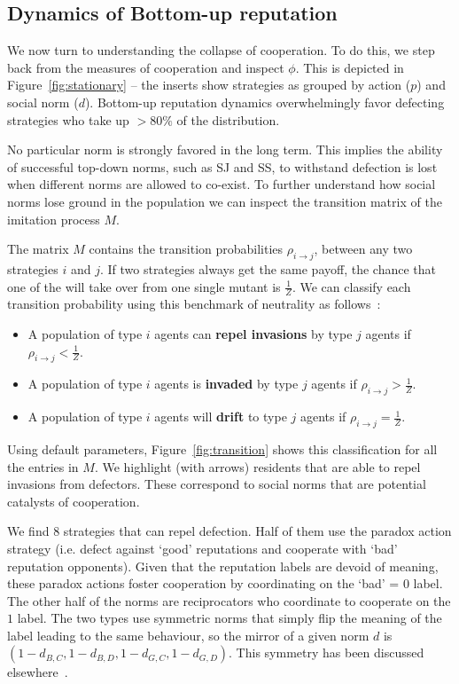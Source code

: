\documentclass[sigconf]{aamas}  %
\begin{document}
\subsection{Dynamics of Bottom-up reputation}

We now turn to understanding the collapse of cooperation. To do this, we step back from the measures of cooperation and inspect $\phi$. This is depicted in Figure~\ref{fig:stationary} -- the inserts show strategies as grouped by action ($p$) and social norm ($d$). Bottom-up reputation dynamics overwhelmingly favor defecting strategies who take up  $>80\%$ of the distribution. 



No particular norm is strongly favored in the long term. This implies the ability of successful top-down norms, such as SJ and SS, to withstand defection is lost when different norms are allowed to co-exist. To further understand how social norms lose ground in the population we can inspect the transition matrix of the imitation process $M$. 

The matrix $M$ contains the transition probabilities $\rho_{i \to j}$, between any two strategies $i$ and $j$. If two strategies always get the same payoff, the chance that one of the will take over from one single mutant is $\frac{1}{Z}$\cite{nowak:book:2006}. We can classify each transition probability using this benchmark of neutrality as follows~\cite{nowak:Nature:2004}: 
\begin{itemize}
	\item A population of type $i$ agents can \textbf{repel invasions} by type $j$ agents if $\rho_{i \to j} < \frac{1}{Z}$. 
 \item A population of type $i$ agents is \textbf{invaded} by type $j$ agents if $\rho_{i \to j} > \frac{1}{Z}$.
 \item A population of type $i$ agents will \textbf{drift} to type $j$ agents if $\rho_{i \to j} = \frac{1}{Z}$.
\end{itemize}

Using default parameters, Figure~\ref{fig:transition} shows this classification for all the entries in $M$. We highlight (with arrows) residents that are able to repel invasions from defectors. These correspond to social norms that are potential catalysts of cooperation. 

We find $8$ strategies that can repel defection. Half of them use the  paradox action strategy (i.e. defect against `good' reputations and cooperate with `bad' reputation opponents). Given that the reputation labels are devoid of meaning, these paradox actions foster cooperation by coordinating on the `bad' = $0$ label. The other half of the norms are reciprocators who coordinate to cooperate on the $1$ label. The two types use symmetric norms that simply flip the meaning of the label leading to the same behaviour, so the mirror of a given norm $d$ is $(1-d_{B,C},1-d_{B,D},1-d_{G,C},1-d_{G,D})$. This symmetry has been discussed elsewhere~\cite{ohtsuki:JTB:2004a, Santos2016}.
\end{document}

